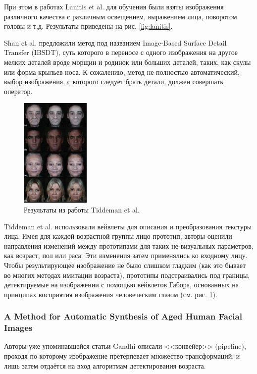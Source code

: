 При этом в работах  Lanitis et al. \cite{lanitis} \cite{lanitis2} \cite{lanitis3} для обучения были взяты изображения различного качества с различным освещением, выражением лица, поворотом головы и т.д. Результаты приведены на рис. \ref{fig:lanitis}.

Shan et al. \cite{shan} предложили метод под названием Image-Based Surface Detail Transfer (IBSDT), суть которого в переносе с одного изображения на другое мелких деталей вроде морщин и родинок или больших деталей, таких, как скулы или форма крыльев носа. К сожалению, метод не полностью автоматический, выбор изображения, с которого следует брать детали, должен совершать оператор.

\begin{figure}[t]
	\centering
	\includegraphics[width=0.3\textwidth]{gandhi/tiddeman.png}
	\caption{Результаты из работы Tiddeman et al. \cite{tiddeman}}
	\label{fig:tiddeman}
\end{figure}

Tiddeman et al. \cite{tiddeman} использовали вейвлеты для описания и преобразования текстуры лица. Имея для каждой возрастной группы лицо-прототип, авторы оценили направления изменений между прототипами для таких не-визуальных параметров, как возраст, пол или раса. Эти изменения затем применялись ко входному лицу. Чтобы результирующее изображение не было слишком гладким (как это бывает во многих методах имитации возраста), прототипы подстраивались под границы, детектируемые на изображении с помощью вейвлетов Габора, основанных на принципах восприятия изображения человеческим глазом (см. рис. \ref{fig:tiddeman}).


\subsubsection{A Method for Automatic Synthesis of Aged Human Facial Images}
Авторы уже упоминавшейся статьи Gandhi \cite{statya_big} описали <<конвейер>> (pipeline), проходя по которому изображение претерпевает множество трансформаций, и лишь затем отдаётся на вход алгоритмам детектирования возраста.


